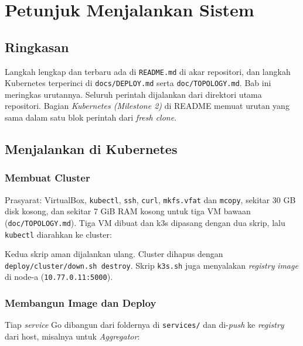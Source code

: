 \chapter{Petunjuk Menjalankan Sistem}

\section{Ringkasan}

Langkah lengkap dan terbaru ada di \texttt{README.md} di akar repositori, dan langkah Kubernetes terperinci di \texttt{docs/DEPLOY.md} serta \texttt{doc/TOPOLOGY.md}. Bab ini meringkas urutannya. Seluruh perintah dijalankan dari direktori utama repositori. Bagian \textit{Kubernetes (Milestone 2)} di README memuat urutan yang sama dalam satu blok perintah dari \textit{fresh clone}.

\section{Menjalankan di Kubernetes}

\subsection{Membuat Cluster}

Prasyarat: VirtualBox, \texttt{kubectl}, \texttt{ssh}, \texttt{curl}, \texttt{mkfs.vfat} dan \texttt{mcopy}, sekitar 30 GB disk kosong, dan sekitar 7 GiB RAM kosong untuk tiga VM bawaan (\texttt{doc/TOPOLOGY.md}). Tiga VM dibuat dan k3s dipasang dengan dua skrip, lalu \texttt{kubectl} diarahkan ke cluster:


Kedua skrip aman dijalankan ulang. Cluster dihapus dengan \texttt{deploy/cluster/down.sh destroy}. Skrip \texttt{k3s.sh} juga menyalakan \textit{registry} \textit{image} di node-a (\texttt{10.77.0.11:5000}).

\subsection{Membangun Image dan Deploy}

Tiap \textit{service} Go dibangun dari foldernya di \texttt{services/} dan di-\textit{push} ke \textit{registry} dari host, misalnya untuk \textit{Aggregator}:

